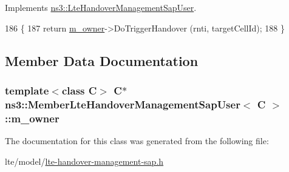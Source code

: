 Implements \hyperlink{classns3_1_1LteHandoverManagementSapUser_aade75e474e4f748ce9ef2e12101c5c42}{ns3\+::\+Lte\+Handover\+Management\+Sap\+User}.


\begin{DoxyCode}
186 \{
187   \textcolor{keywordflow}{return} \hyperlink{classns3_1_1MemberLteHandoverManagementSapUser_a6217b997d53e144941aab7858a0990d1}{m\_owner}->DoTriggerHandover (rnti, targetCellId);
188 \}
\end{DoxyCode}


\subsection{Member Data Documentation}
\subsubsection[{\texorpdfstring{m\+\_\+owner}{m_owner}}]{\setlength{\rightskip}{0pt plus 5cm}template$<$class C$>$ {\bf C}$\ast$ {\bf ns3\+::\+Member\+Lte\+Handover\+Management\+Sap\+User}$<$ {\bf C} $>$\+::m\+\_\+owner\hspace{0.3cm}{\ttfamily [private]}}\hypertarget{classns3_1_1MemberLteHandoverManagementSapUser_a6217b997d53e144941aab7858a0990d1}{}\label{classns3_1_1MemberLteHandoverManagementSapUser_a6217b997d53e144941aab7858a0990d1}


The documentation for this class was generated from the following file\+:\begin{DoxyCompactItemize}
\item 
lte/model/\hyperlink{lte-handover-management-sap_8h}{lte-\/handover-\/management-\/sap.\+h}\end{DoxyCompactItemize}
